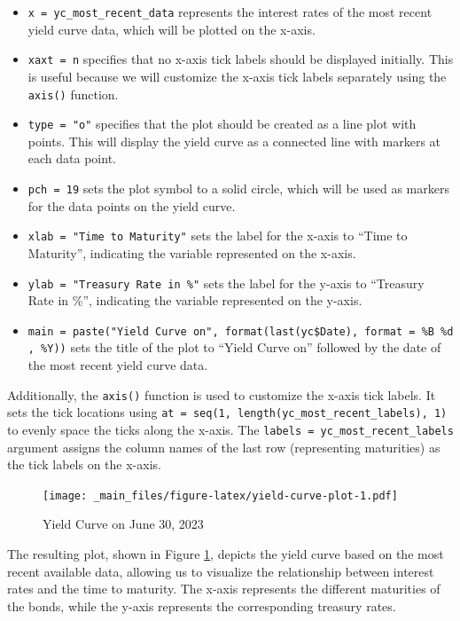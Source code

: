 \documentclass[
]{book}
\providecommand{\tightlist}{%
  \setlength{\itemsep}{0pt}\setlength{\parskip}{0pt}}
\begin{document}
\begin{itemize}
\tightlist
\item
  \texttt{x\ =\ yc\_most\_recent\_data} represents the interest rates of the most recent yield curve data, which will be plotted on the x-axis.
\item
  \texttt{xaxt\ =\ \textquotesingle{}n\textquotesingle{}} specifies that no x-axis tick labels should be displayed initially. This is useful because we will customize the x-axis tick labels separately using the \texttt{axis()} function.
\item
  \texttt{type\ =\ "o"} specifies that the plot should be created as a line plot with points. This will display the yield curve as a connected line with markers at each data point.
\item
  \texttt{pch\ =\ 19} sets the plot symbol to a solid circle, which will be used as markers for the data points on the yield curve.
\item
  \texttt{xlab\ =\ "Time\ to\ Maturity"} sets the label for the x-axis to ``Time to Maturity'', indicating the variable represented on the x-axis.
\item
  \texttt{ylab\ =\ "Treasury\ Rate\ in\ \%"} sets the label for the y-axis to ``Treasury Rate in \%'', indicating the variable represented on the y-axis.
\item
  \texttt{main\ =\ paste("Yield\ Curve\ on",\ format(last(yc\$Date),\ format\ =\ \textquotesingle{}\%B\ \%d,\ \%Y\textquotesingle{}))} sets the title of the plot to ``Yield Curve on'' followed by the date of the most recent yield curve data.
\end{itemize}

Additionally, the \texttt{axis()} function is used to customize the x-axis tick labels. It sets the tick locations using \texttt{at\ =\ seq(1,\ length(yc\_most\_recent\_labels),\ 1)} to evenly space the ticks along the x-axis. The \texttt{labels\ =\ yc\_most\_recent\_labels} argument assigns the column names of the last row (representing maturities) as the tick labels on the x-axis.

\begin{figure}
\centering
\texttt{[image: \_main\_files/figure-latex/yield-curve-plot-1.pdf]}
\caption{\label{fig:yield-curve-plot}Yield Curve on June 30, 2023}
\end{figure}

The resulting plot, shown in Figure \ref{fig:yield-curve-plot}, depicts the yield curve based on the most recent available data, allowing us to visualize the relationship between interest rates and the time to maturity. The x-axis represents the different maturities of the bonds, while the y-axis represents the corresponding treasury rates.
\end{document}
